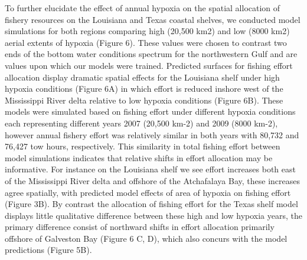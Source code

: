 \documentclass[10pt]{article}
\begin{document}
To further elucidate the effect of annual hypoxia on the spatial allocation of fishery resources on the Louisiana and Texas coastal shelves, we conducted model simulations for both regions comparing high (20,500 km2) and low (8000 km2) aerial extents of hypoxia (Figure 6).  These values were chosen to contrast two ends of the bottom water conditions spectrum for the northwestern Gulf and are values upon which our models were trained.  Predicted surfaces for fishing effort allocation display dramatic spatial effects for the Louisiana shelf under high hypoxia conditions (Figure 6A) in which effort is reduced inshore west of the Mississippi River delta relative to low hypoxia conditions (Figure 6B).  These models were simulated based on fishing effort under different hypoxia conditions each representing different years 2007 (20,500 km-2) and 2009 (8000 km-2), however annual fishery effort was relatively similar in both years with 80,732 and 76,427 tow hours, respectively.  This similarity in total fishing effort between model simulations indicates that relative shifts in effort allocation may be informative.  For instance on the Louisiana shelf we see effort increases both east of the Mississippi River delta and offshore of the Atchafalaya Bay, these increases agree spatially, with predicted model effects of area of hypoxia on fishing effort (Figure 3B).  By contrast the allocation of fishing effort for the Texas shelf model displays little qualitative difference between these high and low hypoxia years, the primary difference consist of northward shifts in effort allocation primarily offshore of Galveston Bay (Figure 6 C, D), which also concurs with the model predictions (Figure 5B).  
\end{document}
